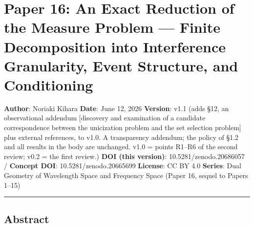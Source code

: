 \documentclass[
]{ltjsarticle}
\author{}
\date{}
\begin{document}
\section{Paper 16: An Exact Reduction of the Measure Problem --- Finite
Decomposition into Interference Granularity, Event Structure, and
Conditioning}\label{paper-16-an-exact-reduction-of-the-measure-problem-finite-decomposition-into-interference-granularity-event-structure-and-conditioning}

\textbf{Author}: Noriaki Kihara \textbf{Date}: June 12, 2026
\textbf{Version}: v1.1 (adds §12, an observational addendum {[}discovery
and examination of a candidate correspondence between the unicization
problem and the set selection problem{]} plus external references, to
v1.0. A transparency addendum; the policy of §1.2 and all results in the
body are unchanged. v1.0 = points R1--R6 of the second review; v0.2 =
the first review.) \textbf{DOI (this version)}: 10.5281/zenodo.20686057
/ \textbf{Concept DOI}: 10.5281/zenodo.20665699 \textbf{License}: CC BY
4.0 \textbf{Series}: Dual Geometry of Wavelength Space and Frequency
Space (Paper 16, sequel to Papers 1--15)

\begin{center}\rule{0.5\linewidth}{0.5pt}\end{center}

\subsection{Abstract}\label{abstract}
\end{document}
